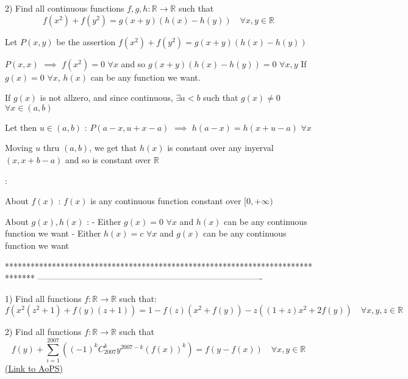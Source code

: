 \begin{solution}
	\begin{tcolorbox}2) Find all continuous functions $f,g,h:\mathbb{R}\to\mathbb{R}$ such that
\[f(x^2)+f(y^2)=g(x+y)\left (h(x)-h(y)  \right ) \quad \forall x,y\in\mathbb{R}\]\end{tcolorbox}
Let $P(x,y)$ be the assertion $f(x^2)+f(y^2)=g(x+y)(h(x)-h(y))$

$P(x,x)$ $\implies$ $f(x^2)=0$ $\forall x$ and so $g(x+y)(h(x)-h(y))=0$ $\forall x,y$
If $g(x)=0$ $\forall x$, $h(x)$ can be any function we want.

If $g(x)$ is not allzero, and since continuous, $\exists a<b$ such that $g(x)\ne 0$ $\forall x\in (a,b)$

Let then $u\in (a,b)$ : $P(a-x,u+x-a)$ $\implies$ $h(a-x)=h(x+u-a)$ $\forall x$

Moving $u$ thru $(a,b)$, we get that $h(x)$ is constant over any inyerval $(x,x+b-a)$ and so is constant over $\mathbb R$

 :

About $f(x)$ : $f(x)$ is any continuous function constant over $[0,+\infty)$

About $g(x),h(x)$ :
- Either $g(x)=0$ $\forall x$ and $h(x)$ can be any continuous function  we want
- Either $h(x)=c$ $\forall x$ and $g(x)$ can be any continuous function  we want
\end{solution}
*******************************************************************************
-------------------------------------------------------------------------------

\begin{problem}
	1) Find all functions $f:\mathbb R \rightarrow \mathbb R $ such that:
\[f(x^2(z^2+1)+f(y)(z+1))=1-f(z)(x^2+f(y))-z((1+z)x^2+2f(y)) \quad \forall x,y,z \in \mathbb R\]

2) Find all functions $f:\mathbb{R}\rightarrow \mathbb{R}$ such that 
\[f(y)+\sum_{i=1}^{2007}\left ( (-1)^kC_{2007}^{k}y^{2007-k}(f(x))^k\right  )=f(y-f(x)) \quad \forall x,y \in \mathbb R\]
	\flushright \href{https://artofproblemsolving.com/community/c6h564193}{(Link to AoPS)}
\end{problem}



